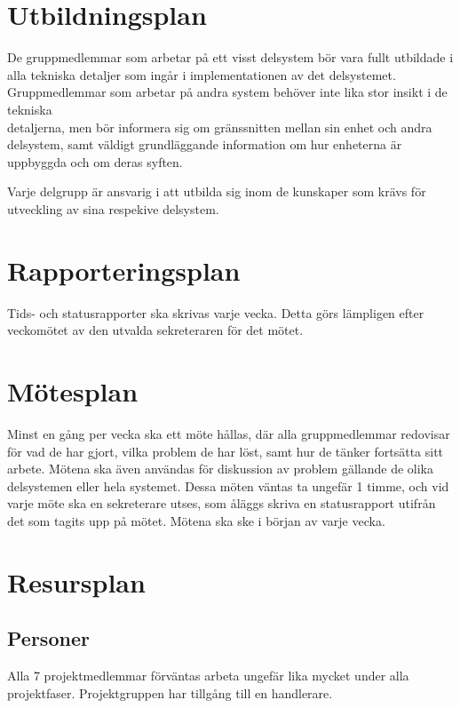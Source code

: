 \documentclass[a4paper,titlepage,12pt]{article}
\begin{document}
	\section{Utbildningsplan}

	De gruppmedlemmar som arbetar på ett visst delsystem bör vara fullt
	utbildade i alla tekniska detaljer som ingår i implementationen av det
	delsystemet. Gruppmedlemmar som arbetar på andra system behöver inte lika
	stor insikt i de tekniska \\ detaljerna, men bör
	informera sig om gränssnitten mellan sin enhet och andra delsystem, samt väldigt 
	grundläggande information om hur enheterna är uppbyggda och om deras syften.

	Varje delgrupp är ansvarig i att utbilda sig inom de kunskaper som krävs
	för utveckling av sina respekive delsystem.

	\section{Rapporteringsplan}
	Tids- och statusrapporter ska skrivas varje vecka. Detta görs lämpligen
	efter veckomötet av den utvalda sekreteraren för det mötet.
	
	\section{Mötesplan}
	Minst en gång per vecka ska ett möte hållas, där alla gruppmedlemmar
	redovisar för vad de har gjort, vilka problem de har löst, samt hur de
	tänker fortsätta sitt arbete. Mötena ska även användas för diskussion av
	problem gällande de olika delsystemen eller hela systemet. Dessa möten väntas 
	ta ungefär 1 timme, och vid varje möte ska en sekreterare utses, som åläggs skriva 
	en statusrapport utifrån det som tagits upp på mötet. Mötena ska ske i början av
	varje vecka.
	
	
	\section{Resursplan}
  
	\subsection{Personer}
	Alla 7 projektmedlemmar förväntas arbeta ungefär lika mycket under alla
	projektfaser. Projektgruppen har tillgång till en handlerare.
	
\end{document}
